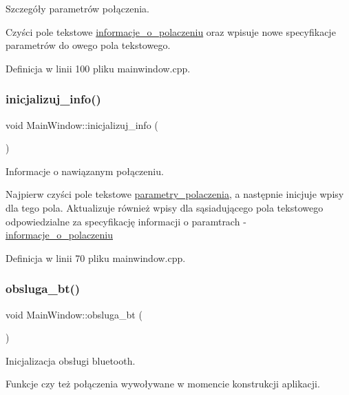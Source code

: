 Szczegóły parametrów połączenia. 

Czyści pole tekstowe \hyperlink{}{informacje\+\_\+o\+\_\+polaczeniu} oraz wpisuje nowe specyfikacje parametrów do owego pola tekstowego. 

Definicja w linii 100 pliku mainwindow.\+cpp.

\mbox{\label{class_main_window_a7b1012fca99df34abcdc108974ab583c}} 
\subsubsection{\texorpdfstring{inicjalizuj\+\_\+info()}{inicjalizuj\_info()}}
{\footnotesize\ttfamily void Main\+Window\+::inicjalizuj\+\_\+info (\begin{DoxyParamCaption}{ }\end{DoxyParamCaption})}



Informacje o nawiązanym połączeniu. 

Najpierw czyści pole tekstowe \hyperlink{}{parametry\+\_\+polaczenia}, a następnie inicjuje wpisy dla tego pola. Aktualizuje również wpisy dla sąsiadującego pola tekstowego odpowiedzialne za specyfikację informacji o paramtrach -\/ \hyperlink{}{informacje\+\_\+o\+\_\+polaczeniu} 

Definicja w linii 70 pliku mainwindow.\+cpp.

\mbox{\label{class_main_window_a2f5ead67e758baf55cf71b746e870192}} 
\subsubsection{\texorpdfstring{obsluga\+\_\+bt()}{obsluga\_bt()}}
{\footnotesize\ttfamily void Main\+Window\+::obsluga\+\_\+bt (\begin{DoxyParamCaption}{ }\end{DoxyParamCaption})}



Inicjalizacja obsługi bluetooth. 

Funkcje czy też połączenia wywoływane w momencie konstrukcji aplikacji. 

